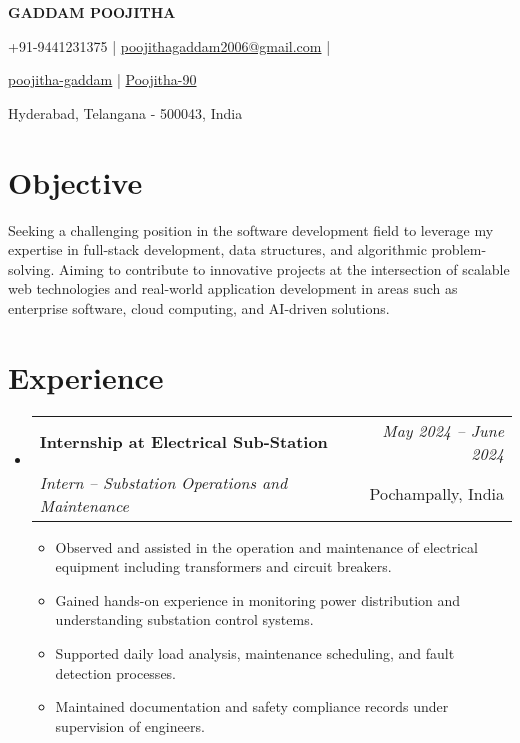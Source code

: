 \documentclass[a4paper,11pt]{article}
\makeatletter
\newcommand{\resumeSubheading}[4]{
\vspace{0.5mm}\item
    \begin{tabular*}{0.98\textwidth}[t]{l@{\extracolsep{\fill}}r}
        \textbf{#1} & \textit{\footnotesize{#4}} \\
        \textit{\footnotesize{#3}} &  \footnotesize{#2}\\
    \end{tabular*}
    \vspace{-2.4mm}
}
\newcommand{\resumeSubHeadingListStart}{\begin{itemize}[leftmargin=*,labelsep=1mm]}
\newcommand{\resumeItemListStart}{\begin{itemize}[leftmargin=*,labelsep=1mm,itemsep=0.5mm]}
\newcommand{\resumeSubHeadingListEnd}{\end{itemize}\vspace{2mm}}
\newcommand{\resumeItemListEnd}{\end{itemize}\vspace{-2mm}}
\newcommand{\socialicon}[1]{\raisebox{-0.05em}{\resizebox{!}{1em}{#1}}}
\newcommand{\headerfontiii}{\fontfamily{ppl}\selectfont} %
\makeatother
\begin{document}
\headerfontiii

\begin{center}
    {\Huge\textbf{GADDAM POOJITHA}}
\end{center}
\vspace{-6mm}

\begin{center}
    \small{
    +91-9441231375 | \href{mailto:poojithagaddam2006@gmail.com}{poojithagaddam2006@gmail.com} | 
    }
\end{center}
\vspace{-6mm}

\begin{center}
    \small{
    \socialicon{\faLinkedin} \href{https://www.linkedin.com/in/poojitha-gaddam}{poojitha-gaddam} | 
    \socialicon{\faGithub} \href{https://github.com/Poojitha-90}{Poojitha-90}  
   
    }
\end{center}
\vspace{-6mm}
\begin{center}
    \small{Hyderabad, Telangana - 500043, India}
\end{center}

\vspace{-4mm}

\section{\textbf{Objective}}
\vspace{1mm}
\small{
Seeking a challenging position in the software development field to leverage my expertise in full-stack development, data structures, and algorithmic problem-solving. Aiming to contribute to innovative projects at the intersection of scalable web technologies and real-world application development in areas such as enterprise software, cloud computing, and AI-driven solutions.


}
\vspace{-2mm}
\section{\textbf{Experience}}
\vspace{-0.4mm}
\resumeSubHeadingListStart
  \resumeSubheading
    {Internship at Electrical Sub-Station}{Pochampally, India}
    {Intern – Substation Operations and Maintenance}{May 2024 – June 2024}
    \resumeItemListStart
      \item Observed and assisted in the operation and maintenance of electrical equipment including transformers and circuit breakers.
      \item Gained hands-on experience in monitoring power distribution and understanding substation control systems.
      \item Supported daily load analysis, maintenance scheduling, and fault detection processes.
      \item Maintained documentation and safety compliance records under supervision of engineers.
    \resumeItemListEnd 
\resumeSubHeadingListEnd
\vspace{-6mm}
\end{document}
